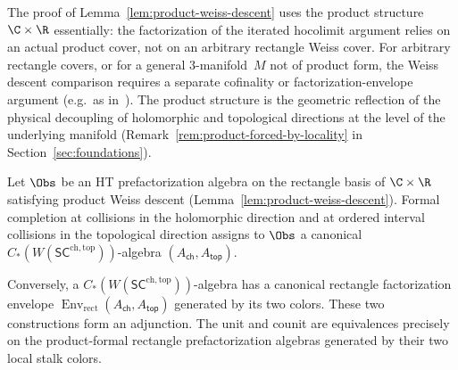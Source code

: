 \begin{remark}
\label{rem:product-weiss}
The proof of Lemma~\ref{lem:product-weiss-descent} uses the product
structure $\C \times \R$ essentially: the factorization of the
iterated hocolimit argument relies on an actual product cover, not
on an arbitrary rectangle Weiss cover. For arbitrary rectangle
covers, or for a general $3$-manifold~$M$ not of product form, the
Weiss descent comparison requires a separate cofinality or
factorization-envelope argument (e.g.\ as in~\cite{CG17}). The
product structure is the geometric reflection of the physical
decoupling of holomorphic and topological directions at the level of
the underlying manifold (Remark~\ref{rem:product-forced-by-locality}
in Section~\ref{sec:foundations}).
\end{remark}

\begin{theorem}
\label{thm:recognition-SC}
Let $\Obs$ be an HT prefactorization algebra on the rectangle basis
of $\C\times\R$ satisfying product Weiss descent
\textup{(}Lemma~\ref{lem:product-weiss-descent}\textup{)}. Formal
completion at collisions in the holomorphic direction and at ordered
interval collisions in the topological direction assigns to $\Obs$ a
canonical $C_\ast(W(\mathsf{SC}^{\mathrm{ch,top}}))$-algebra
$(A_{\mathsf{ch}},A_{\mathsf{top}})$.

Conversely, a $C_\ast(W(\mathsf{SC}^{\mathrm{ch,top}}))$-algebra
has a canonical rectangle factorization envelope
$\operatorname{Env}_{\mathrm{rect}}(A_{\mathsf{ch}},A_{\mathsf{top}})$ generated
by its two colors. These two constructions form an adjunction. The
unit and counit are equivalences precisely on the product-formal
rectangle prefactorization algebras generated by their two local
stalk colors.
\end{theorem}

